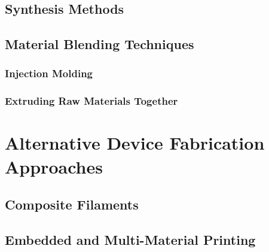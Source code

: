 \subsection{Synthesis Methods\label{sec:literatureReview:PLCL:synthesis}}

\subsection{Material Blending Techniques\label{sec:literatureReview:PLCL:blending}}

\subsubsection{Injection Molding\label{sec:literatureReview:PLCL:injectionMolding}}

\subsubsection{Extruding Raw Materials Together\label{sec:literatureReview:PLCL:coextrusion}}

\section{Alternative Device Fabrication Approaches\label{sec:literatureReview:alternatives}}

\subsection{Composite Filaments\label{sec:literatureReview:alternatives:composite}}

\subsection{Embedded and Multi-Material Printing\label{sec:literatureReview:alternatives:multiMaterial}}


